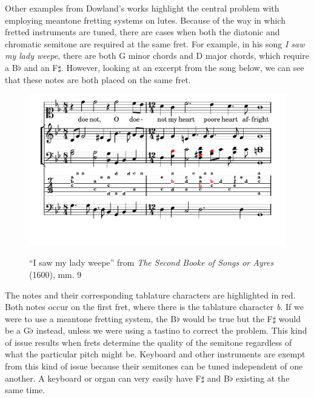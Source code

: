 Other examples from Dowland's works highlight the central problem with employing meantone fretting
systems on lutes. Because of the way in which fretted instruments are tuned, there are cases when
both the diatonic and chromatic semitone are required at the same fret. For example, in his song
\textit{I saw my lady weepe}, there are both G minor chords and D major chords, which require a
B$\flat$ and an F$\sharp$. However, looking at an excerpt from the song below, we can see that
these notes are both placed on the same fret.
\begin{figure}[h]
\centering
\includegraphics{examples/saw.pdf}
\label{dowland-saw}
\caption{``I saw my lady weepe'' from \textit{The Second Booke of Songs or Ayres} (1600), mm. 9}
\end{figure}
The notes and their corresponding tablature characters are highlighted in red. Both
notes occur on the first fret, where there is the tablature character \textit{b}. If
we were to use a meantone fretting system, the B$\flat$ would be true but the F$\sharp$
would be a G$\flat$ instead, unless we were using a tastino to correct the problem.
This kind of issue results when frets determine the quality of the semitone regardless
of what the particular pitch might be. Keyboard and other instruments are exempt from
this kind of issue because their semitones can be tuned independent of one another. A
keyboard or organ can very easily have F$\sharp$ and B$\flat$ existing at the same time.

